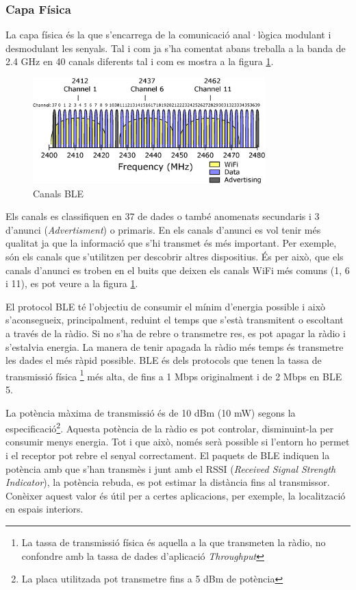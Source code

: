 \subsubsection{Capa Física}
La capa física és la que s'encarrega de la comunicació anal·lògica modulant i desmodulant les senyals.
Tal i com ja s'ha comentat abans treballa a la banda de 2.4 GHz en 40 canals diferents tal i com es mostra a la figura \ref{BLE_Channels}.

\begin{figure}[hb]
	\begin{center}
		\includegraphics[width=0.8\textwidth]{./diagrames/BLE_WiFi}
		\caption{Canals BLE}
		\label{BLE_Channels}
	\end{center}
\end{figure}

Els canals es classifiquen en 37 de dades o també anomenats secundaris i 3 d'anunci (\textit{Advertisment}) o primaris.
En els canals d'anunci es vol tenir més qualitat ja que la informació que s'hi transmet és més important.
Per exemple, són els canals que s'utilitzen per descobrir altres dispositius.
És per això, que els canals d'anunci es troben en el buits que deixen els canals WiFi més comuns (1, 6 i 11), es pot veure a la figura \ref{BLE_Channels}.

El protocol BLE té l'objectiu de consumir el mínim d'energia possible i això s'aconsegueix, principalment, reduint el temps que s'està transmitent o escoltant a través de la ràdio.
Si no s'ha de rebre o transmetre res, es pot apagar la ràdio i s'estalvia energia.
La manera de tenir apagada la ràdio més temps és transmetre les dades el més ràpid possible.
BLE és dels protocols que tenen la tassa de transmissió física \footnote{La tassa de transmissió física és aquella a la que transmeten la ràdio, no confondre amb la tassa de dades d'aplicació \textit{Throughput}} més alta, de fins a 1 Mbps originalment i de 2 Mbps en BLE 5.

La potència màxima de transmissió és de 10 dBm (10 mW) segons la especificació\footnote{La placa utilitzada pot transmetre fins a 5 dBm de potència}.
Aquesta potència de la ràdio es pot controlar, disminuint-la per consumir menys energia.
Tot i que això, només serà possible si l'entorn ho permet i el receptor pot rebre el senyal correctament.
El paquets de BLE indiquen la potència amb que s'han transmès i junt amb el RSSI (\textit{Received Signal Strength Indicator}), la potència rebuda, es pot estimar la distància fins al transmissor.
Conèixer aquest valor és útil per a certes aplicacions, per exemple, la localització en espais interiors.

